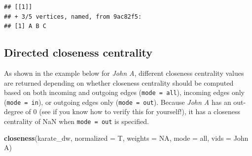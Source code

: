 \documentclass[
]{book}
\newenvironment{Shaded}{\begin{snugshade}}{\end{snugshade}}
\newcommand{\AttributeTok}[1]{\textcolor[rgb]{0.13,0.29,0.53}{#1}}
\newcommand{\CommentTok}[1]{\textcolor[rgb]{0.56,0.35,0.01}{\textit{#1}}}
\newcommand{\ConstantTok}[1]{\textcolor[rgb]{0.56,0.35,0.01}{#1}}
\newcommand{\DecValTok}[1]{\textcolor[rgb]{0.00,0.00,0.81}{#1}}
\newcommand{\FunctionTok}[1]{\textcolor[rgb]{0.13,0.29,0.53}{\textbf{#1}}}
\newcommand{\NormalTok}[1]{#1}
\newcommand{\OtherTok}[1]{\textcolor[rgb]{0.56,0.35,0.01}{#1}}
\newcommand{\SpecialCharTok}[1]{\textcolor[rgb]{0.81,0.36,0.00}{\textbf{#1}}}
\newcommand{\StringTok}[1]{\textcolor[rgb]{0.31,0.60,0.02}{#1}}
\begin{document}
\begin{Shaded}
\end{Shaded}

\begin{verbatim}
## [[1]]
## + 3/5 vertices, named, from 9ac82f5:
## [1] A B C
\end{verbatim}

\subsection{Directed closeness centrality}\label{directed-closeness-centrality}

As shown in the example below for \emph{John A}, different closeness centrality values are returned depending on whether closeness centrality should be computed based on both incoming and outgoing edges (\texttt{mode\ =\ \textquotesingle{}all\textquotesingle{}}), incoming edges only (\texttt{mode\ =\ \textquotesingle{}in\textquotesingle{}}), or outgoing edges only (\texttt{mode\ =\ \textquotesingle{}out\textquotesingle{}}). Because \emph{John A} has an out-degree of 0 (see if you know how to verify this for yourself!), it has a closeness centrality of NaN when \texttt{mode\ =\ \textquotesingle{}out\textquotesingle{}} is specified.

\begin{Shaded}
\begin{Highlighting}[]
\FunctionTok{closeness}\NormalTok{(karate\_dw, }\AttributeTok{normalized =}\NormalTok{ T, }\AttributeTok{weights =} \ConstantTok{NA}\NormalTok{, }\AttributeTok{mode =} \StringTok{\textquotesingle{}all\textquotesingle{}}\NormalTok{, }\AttributeTok{vids =} \StringTok{\textquotesingle{}John A\textquotesingle{}}\NormalTok{)}
\end{Highlighting}
\end{Shaded}
\end{document}
